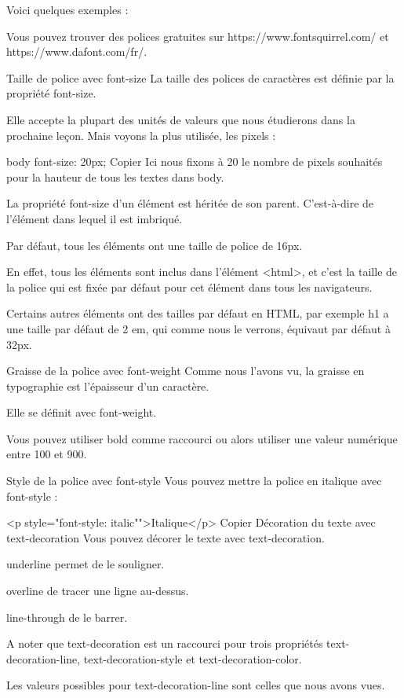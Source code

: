 \documentclass[a4paper]{article}
\begin{document}
Voici quelques exemples :


Vous pouvez trouver des polices gratuites sur https://www.fontsquirrel.com/ et https://www.dafont.com/fr/.

Taille de police avec font-size
La taille des polices de caractères est définie par la propriété font-size.

Elle accepte la plupart des unités de valeurs que nous étudierons dans la prochaine leçon. Mais voyons la plus utilisée, les pixels :

body {
  font-size: 20px;
}
Copier
Ici nous fixons à 20 le nombre de pixels souhaités pour la hauteur de tous les textes dans body.

La propriété font-size d'un élément est héritée de son parent. C'est-à-dire de l'élément dans lequel il est imbriqué.

Par défaut, tous les éléments ont une taille de police de 16px.

En effet, tous les éléments sont inclus dans l'élément <html>, et c'est la taille de la police qui est fixée par défaut pour cet élément dans tous les navigateurs.

Certains autres éléments ont des tailles par défaut en HTML, par exemple h1 a une taille par défaut de 2 em, qui comme nous le verrons, équivaut par défaut à 32px.

Graisse de la police avec font-weight
Comme nous l'avons vu, la graisse en typographie est l'épaisseur d'un caractère.

Elle se définit avec font-weight.

Vous pouvez utiliser bold comme raccourci ou alors utiliser une valeur numérique entre 100 et 900.

Style de la police avec font-style
Vous pouvez mettre la police en italique avec font-style :

<p style="font-style: italic"">Italique</p>
Copier
Décoration du texte avec text-decoration
Vous pouvez décorer le texte avec text-decoration.

underline permet de le souligner.

overline de tracer une ligne au-dessus.

line-through de le barrer.

A noter que text-decoration est un raccourci pour trois propriétés text-decoration-line, text-decoration-style et text-decoration-color.

Les valeurs possibles pour text-decoration-line sont celles que nous avons vues.
\end{document}
